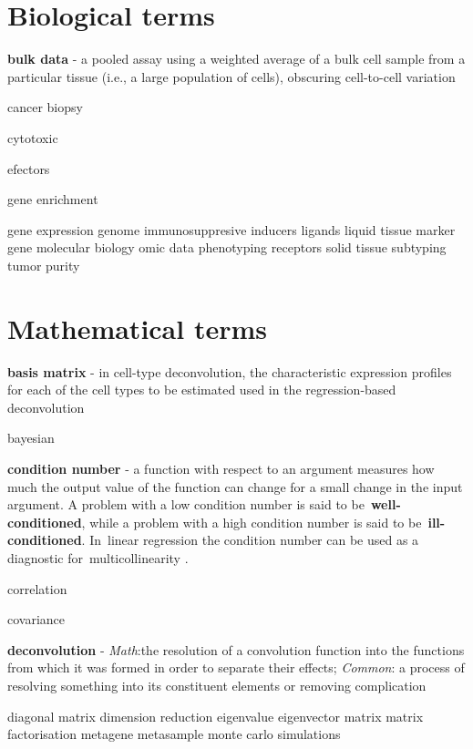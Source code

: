 \documentclass[12pt,]{book}
\theoremstyle{definition}
\theoremstyle{definition}
\theoremstyle{definition}
\theoremstyle{remark}
\begin{document}
\hypertarget{biological-terms}{%
\section*{Biological terms}\label{biological-terms}}

\textbf{bulk data} - a pooled assay using a weighted average of a bulk
cell sample from a particular tissue (i.e., a large population of
cells), obscuring cell-to-cell variation

cancer biopsy

cytotoxic

efectors

gene enrichment

gene expression genome immunosuppresive inducers ligands liquid tissue
marker gene molecular biology omic data phenotyping receptors solid
tissue subtyping tumor purity

\hypertarget{mathematical-terms}{%
\section*{Mathematical terms}\label{mathematical-terms}}

\textbf{basis matrix} - in cell-type deconvolution, the characteristic
expression profiles for each of the cell types to be estimated used in
the regression-based deconvolution

bayesian

\textbf{condition number} - a function with respect to an argument
measures how much the output value of the function can change for a
small change in the input argument. A problem with a low condition
number is said to be~\textbf{well-conditioned}, while a problem with a
high condition number is said to be~\textbf{ill-conditioned}. In~linear
regression the condition number can be used as a diagnostic
for~multicollinearity \citep{Belsley2005}.

correlation

covariance

\textbf{deconvolution} - \emph{Math}:the resolution of a convolution
function into the functions from which it was formed in order to
separate their effects; \emph{Common}: a process of resolving something
into its constituent elements or removing complication
\citep{deconvolution}

diagonal matrix dimension reduction eigenvalue eigenvector matrix matrix
factorisation metagene metasample monte carlo simulations
\end{document}
